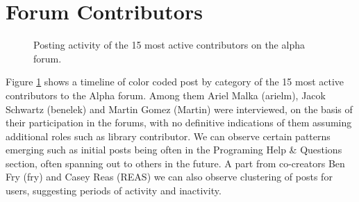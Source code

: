 \cleardoublepage
\changepapersize{305.3mm:210mm}

\thispagestyle{empty}
\begingroup
\raggedright 
{}
\section*{Forum Contributors} 
\fontsize{12pt}{14pt}\selectfont
{}
\endgroup

\newpage
{}


\vfill

\begin{figure}[h!]
	\centering
	\caption{Posting activity of the 15 most active contributors on the alpha forum.}
	\label{fig:processing-alpha-dot}
\end{figure}

\begin{multicols}{3}
	\noindent
  Figure \ref*{fig:processing-alpha-dot} shows a timeline of color coded post by category of the 15 most active contributors to the Alpha forum. Among them Ariel Malka (arielm), Jacok Schwartz (benelek) and Martin Gomez (Martin) were interviewed, on the basis of their participation in the forums, with no definitive indications of them assuming additional roles such as library contributor. We can observe certain patterns emerging such as initial posts being often in the Programing Help \& Questions section, often spanning out to others in the future. A part from co-creators Ben Fry (fry) and Casey Reas (REAS) we can also observe clustering of posts for users, suggesting periods of activity and inactivity. 
  \columnbreak

  \vfill\null
\end{multicols}
